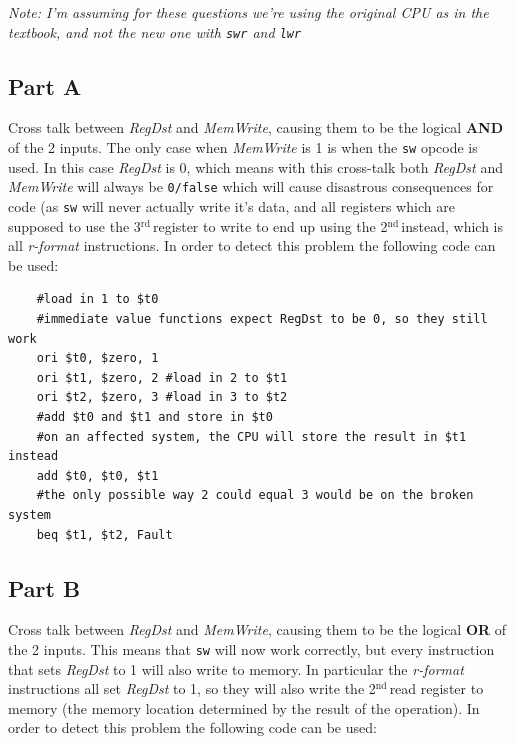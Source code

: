\documentclass[11pt]{article} %
\newcommand{\strong}[1]{\textbf{#1}}
\newcommand{\code}[1]{\texttt{#1}}
\newcommand{\nd}{$^{\text{nd}\ }$}
\newcommand{\rd}{$^{\text{rd}\ }$}
\begin{document}
\emph{Note: I'm assuming for these questions we're using the original CPU as in the textbook, and not the new one with \code{swr} and \code{lwr}}

\subsection{Part A}

Cross talk between \emph{RegDst} and \emph{MemWrite}, causing them to be the logical \strong{AND} of the 2 inputs. The only case when \emph{MemWrite} is 1 is when the \code{sw} opcode is used. In this case \emph{RegDst} is 0, which means with this cross-talk both \emph{RegDst} and \emph{MemWrite} will always be \code{0/false} which will cause disastrous consequences for code (as \code{sw} will never actually write it's data, and all registers which are supposed to use the 3\rd register to write to end up using the 2\nd instead, which is all \emph{r-format} instructions. In order to detect this problem the following code can be used:

\begin{verbatim}
    #load in 1 to $t0
    #immediate value functions expect RegDst to be 0, so they still work
    ori $t0, $zero, 1
    ori $t1, $zero, 2 #load in 2 to $t1
    ori $t2, $zero, 3 #load in 3 to $t2
    #add $t0 and $t1 and store in $t0
    #on an affected system, the CPU will store the result in $t1 instead
    add $t0, $t0, $t1 
    #the only possible way 2 could equal 3 would be on the broken system
    beq $t1, $t2, Fault 
\end{verbatim}

\subsection{Part B}

Cross talk between \emph{RegDst} and \emph{MemWrite}, causing them to be the logical \strong{OR} of the 2 inputs. This means that \code{sw} will now work correctly, but every instruction that sets \emph{RegDst} to 1 will also write to memory. In particular the \emph{r-format} instructions all set \emph{RegDst} to 1, so they will also write the 2\nd read register to memory (the memory location determined by the result of the operation). In order to detect this problem the following code can be used:
\end{document}
